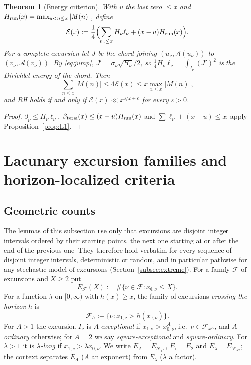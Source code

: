 \documentclass[11pt]{amsart}
\numberwithin{equation}{section}
\theoremstyle{plain}
\newtheorem{theorem}{Theorem}[section]
\theoremstyle{definition}
\theoremstyle{remark}
\newcommand{\Anet}{\mathcal{A}}
\newcommand{\eps}{\varepsilon}
\newcommand{\En}{\mathcal{E}}
\newcommand{\F}{\mathcal{F}}
\begin{document}
\begin{theorem}[Energy criterion]
\label{thm:energy}
With $u$ the last zero $\le x$ and $H_{\rm run}(x)=\max_{u<n\le x}|M(n)|$,
define
\begin{equation}
\label{eq:energy_def}
  \En(x):=\frac14\Bigl(\sum_{v_\nu\le x}H_\nu\ell_\nu+(x-u)H_{\rm run}(x)\Bigr).
\end{equation}
For a complete excursion let $J$ be the chord joining
$(u_\nu,\Anet(u_\nu))$ to $(v_\nu,\Anet(v_\nu))$. By \eqref{eq:jump},
$J'=\sigma_\nu\sqrt{H_\nu}/2$, so $\tfrac14H_\nu\ell_\nu=\int_{I_\nu}(J')^2$
is the Dirichlet energy of the chord. Then
\begin{equation}
\label{eq:energy_sandwich}
  \sum_{n\le x}|M(n)|\le4\En(x)\le x\max_{n\le x}|M(n)|,
\end{equation}
and RH holds if and only if $\En(x)\ll x^{3/2+\eps}$ for every $\eps>0$.
\end{theorem}

\begin{proof}
$\beta_\nu\le H_\nu\ell_\nu$, $\beta_{\rm term}(x)\le(x-u)H_{\rm run}(x)$ and
$\sum\ell_\nu+(x-u)\le x$; apply Proposition~\ref{prop:L1}.
\end{proof}

\section{Lacunary excursion families and horizon-localized criteria}
\label{sec:lacunary}

\subsection{Geometric counts}
\label{subsec:geometric}

The lemmas of this subsection use only that excursions are disjoint integer
intervals ordered by their starting points, the next one starting at or
after the end of the previous one. They therefore hold verbatim for every
sequence of disjoint integer intervals, deterministic or random, and in
particular pathwise for any stochastic model of excursions
(Section~\ref{subsec:extreme}). For a family $\F$ of excursions and $X\ge2$
put
\[
E_\F(X):=\#\{\nu\in\F:x_{0,\nu}\le X\}.
\]
For a function $h$ on $[0,\infty)$ with $h(x)\ge x$, the family of
excursions \emph{crossing the horizon} $h$ is
\[
\F_h:=\{\nu:x_{1,\nu}>h(x_{0,\nu})\}.
\]
For $A>1$ the excursion $I_\nu$ is \emph{$A$-exceptional} if
$x_{1,\nu}>x_{0,\nu}^A$, i.e.\ $\nu\in\F_{x^A}$, and \emph{$A$-ordinary}
otherwise; for $A=2$ we say \emph{square-exceptional} and
\emph{square-ordinary}. For $\lambda>1$ it is \emph{$\lambda$-long} if
$x_{1,\nu}>\lambda x_{0,\nu}$. We write $E_A=E_{\F_{x^A}}$,
$E_\square=E_2$ and $E_\lambda=E_{\F_{\lambda x}}$; the context separates
$E_A$ ($A$ an exponent) from $E_\lambda$ ($\lambda$ a factor).
\end{document}
